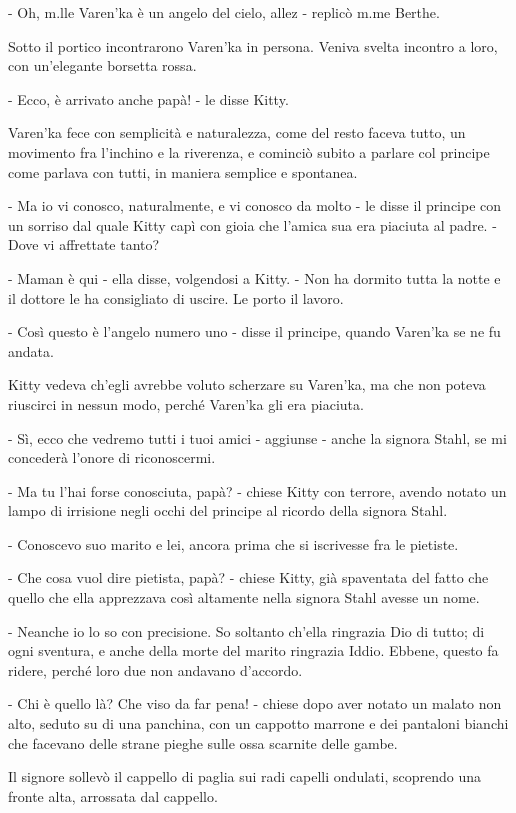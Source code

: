 - Oh, m.lle Varen'ka è un angelo del cielo, allez - replicò m.me Berthe. 

Sotto il portico incontrarono Varen'ka in persona. Veniva svelta incontro a loro, con un'elegante borsetta rossa. 

- Ecco, è arrivato anche papà! - le disse Kitty. 

Varen'ka fece con semplicità e naturalezza, come del resto faceva tutto, un movimento fra l'inchino e la riverenza, e cominciò subito a parlare col principe come parlava con tutti, in maniera semplice e spontanea. 

- Ma io vi conosco, naturalmente, e vi conosco da molto - le disse il principe con un sorriso dal quale Kitty capì con gioia che l'amica sua era piaciuta al padre. - Dove vi affrettate tanto? 

- Maman è qui - ella disse, volgendosi a Kitty. - Non ha dormito tutta la notte e il dottore le ha consigliato di uscire. Le porto il lavoro. 

- Così questo è l'angelo numero uno - disse il principe, quando Varen'ka se ne fu andata. 

Kitty vedeva ch'egli avrebbe voluto scherzare su Varen'ka, ma che non poteva riuscirci in nessun modo, perché Varen'ka gli era piaciuta. 

- Sì, ecco che vedremo tutti i tuoi amici - aggiunse - anche la signora Stahl, se mi concederà l'onore di riconoscermi. 

- Ma tu l'hai forse conosciuta, papà? - chiese Kitty con terrore, avendo notato un lampo di irrisione negli occhi del principe al ricordo della signora Stahl. 

- Conoscevo suo marito e lei, ancora prima che si iscrivesse fra le pietiste. 

- Che cosa vuol dire pietista, papà? - chiese Kitty, già spaventata del fatto che quello che ella apprezzava così altamente nella signora Stahl avesse un nome. 

- Neanche io lo so con precisione. So soltanto ch'ella ringrazia Dio di tutto; di ogni sventura, e anche della morte del marito ringrazia Iddio. Ebbene, questo fa ridere, perché loro due non andavano d'accordo. 

- Chi è quello là? Che viso da far pena! - chiese dopo aver notato un malato non alto, seduto su di una panchina, con un cappotto marrone e dei pantaloni bianchi che facevano delle strane pieghe sulle ossa scarnite delle gambe. 

Il signore sollevò il cappello di paglia sui radi capelli ondulati, scoprendo una fronte alta, arrossata dal cappello. 

